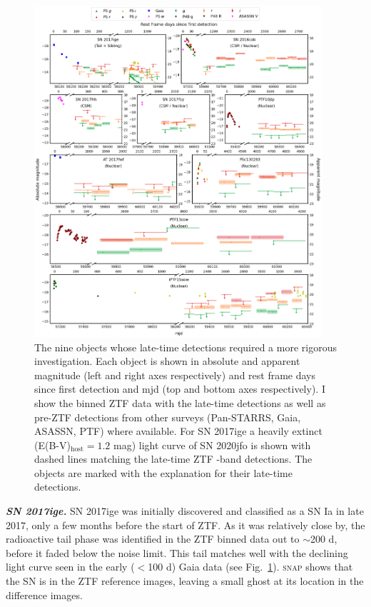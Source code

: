 \documentclass[a4paper,oneside,12pt, class=Latex/Classes/PhDthesisPSnPDF, crop=false]{standalone}
\begin{document}
\begin{figure}
    \centering
    \includegraphics[width=0.95\textwidth]{../Images/chapter_4/weirdos.png}
    \caption{The nine objects whose late-time detections required a more rigorous investigation. Each object is shown in absolute and apparent magnitude (left and right axes respectively) and rest frame days since first detection and mjd (top and bottom axes respectively). I show the binned ZTF data with the late-time detections as well as pre-ZTF detections from other surveys (Pan-STARRS, Gaia, ASASSN, PTF) where available. For SN 2017ige a heavily extinct (E(B-V)$_\text{host}=1.2$ mag) light curve of SN 2020jfo is shown with dashed lines matching the late-time ZTF \ztfr-band detections. The objects are marked with the explanation for their late-time detections.}
    \label{weirdo_plots}
\end{figure}


\textit{\textbf{SN 2017ige.}}
SN 2017ige was initially discovered and classified as a SN Ia in late 2017, only a few months before the start of ZTF. As it was relatively close by, the radioactive tail phase was identified in the ZTF binned data out to $\sim$200 d, before it faded below the noise limit. This tail matches well with the declining light curve seen in the early ($<$100 d) Gaia data (see Fig.~\ref{weirdo_plots}). \textsc{snap} shows that the SN is in the ZTF reference images, leaving a small ghost at its location in the difference images. 
\end{document}
